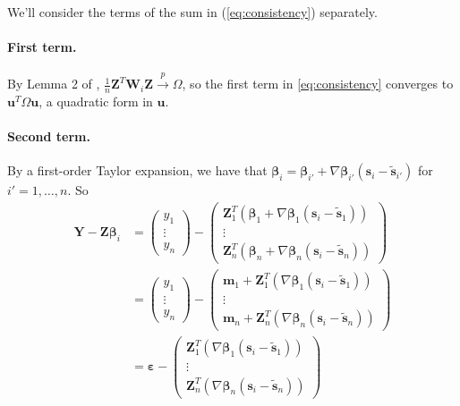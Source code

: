 \documentclass[authoryear, review, 11pt]{elsarticle}
\begin{document}
  We'll consider the terms of the sum in (\ref{eq:consistency}) separately.
  
  \paragraph{First term.} By Lemma 2 of \cite{Sun-Yan-Zhang-Lu-2014}, $\frac{1}{n} \bm{Z}^T \bm{W}_i \bm{Z} \xrightarrow{p} \Omega$, so the first term in \ref{eq:consistency} converges to $\bm{u}^T \Omega \bm{u}$, a quadratic form in $\bm{u}$.
  
  \paragraph{Second term.} By a first-order Taylor expansion, we have that $\bm{\beta}_i = \bm{\beta}_{i'} + \nabla \bm{\beta}_{i'} (\bm{s}_i - \tilde{\bm{s}}_{i'})$ for $i' = 1, \dots, n$. So
  \begin{align*}
    \bm{Y} - \bm{Z} \bm{\beta}_i &= \left( \begin{array}{c} y_1 \\ \vdots \\ y_n \end{array} \right) - \left( \begin{array}{c} \bm{Z}_1^T ( \bm{\beta}_1 + \nabla \bm{\beta}_1 (\bm{s}_i - \tilde{\bm{s}}_1) ) \\ \vdots \\ \bm{Z}_n^T ( \bm{\beta}_n + \nabla \bm{\beta}_n (\bm{s}_i - \tilde{\bm{s}}_n) ) \end{array} \right) \\
    &= \left( \begin{array}{c} y_1 \\ \vdots \\ y_n \end{array} \right) - \left( \begin{array}{c} \bm{m}_1 + \bm{Z}_1^T ( \nabla \bm{\beta}_1 (\bm{s}_i - \tilde{\bm{s}}_1) ) \\ \vdots \\ \bm{m}_n + \bm{Z}_n^T ( \nabla \bm{\beta}_n (\bm{s}_i - \tilde{\bm{s}}_n) ) \end{array} \right)\\
    &= \bm{\varepsilon} - \left( \begin{array}{c} \bm{Z}_1^T ( \nabla \bm{\beta}_1 (\bm{s}_i - \tilde{\bm{s}}_1) ) \\ \vdots \\ \bm{Z}_n^T ( \nabla \bm{\beta}_n (\bm{s}_i - \tilde{\bm{s}}_n) ) \end{array} \right)
  \end{align*}
  
\end{document}
